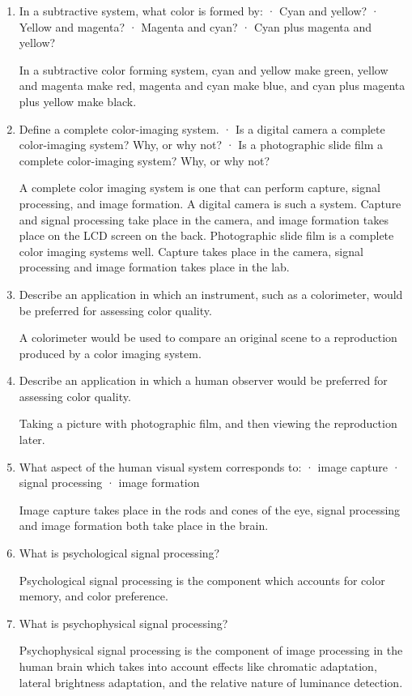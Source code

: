 \documentclass{amsart}
\theoremstyle{definition}
\theoremstyle{remark}
\numberwithin{equation}{section}
\begin{document}
\begin{enumerate}
\item In a subtractive system, what color is formed by: · Cyan and
yellow? · Yellow and magenta? · Magenta and cyan? · Cyan plus
magenta and yellow?
\par In a subtractive color forming system, cyan and yellow make
green, yellow and magenta make red, magenta and cyan make blue,
and cyan plus magenta plus yellow make black.

\item Define a complete color-imaging system.
 · Is a digital camera a complete color-imaging system? Why, or why not?
 · Is a photographic slide film a complete color-imaging system? Why, or why not?
 \par A complete color imaging system is one that can perform
 capture, signal processing, and image formation.  A digital
 camera is such a system.  Capture and signal processing take
 place in the camera, and image formation takes place on the LCD
 screen on the back.  Photographic slide film is a complete color
 imaging systems well.  Capture takes place in the camera,
 signal processing and image formation takes place in the lab.

\item Describe an application in which an instrument, such as a
colorimeter, would be preferred for assessing color quality.
\par A colorimeter would be used to compare an original scene to a
reproduction produced by a color imaging system.

\item Describe an application in which a human observer would be
preferred for assessing color quality.
\par Taking a picture with photographic film, and then viewing the
reproduction later.

\item What aspect of the human visual system corresponds to:
 · image capture
 · signal processing
 · image formation
\par Image capture takes place in the rods and cones of the eye,
signal processing and image formation both take place in the
brain.

\item What is psychological signal processing?
\par Psychological signal processing is the component which
accounts for color memory, and color preference.

 \item What is psychophysical signal processing?
\par Psychophysical signal processing is the component of image
processing in the human brain which takes into account effects
like chromatic adaptation, lateral brightness adaptation, and the
relative nature of luminance detection.


\end{enumerate}
\end{document}
